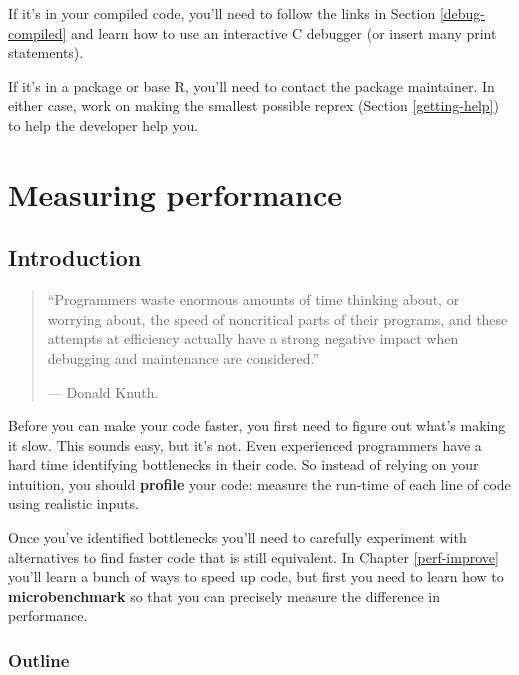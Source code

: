\documentclass[]{book}
\begin{document}
\begin{itemize}
  If it's in your compiled code, you'll need to follow the links in Section
  \ref{debug-compiled} and learn how to use an interactive C debugger
  (or insert many print statements).

  If it's in a package or base R, you'll need to contact the package
  maintainer. In either case, work on making the smallest possible
  reprex (Section \ref{getting-help}) to help the developer help you.
\end{itemize}

\hypertarget{perf-measure}{%
\chapter{Measuring performance}\label{perf-measure}}


\hypertarget{introduction-6}{%
\section{Introduction}\label{introduction-6}}

\begin{quote}
``Programmers waste enormous amounts of time thinking about, or worrying
about, the speed of noncritical parts of their programs, and these attempts
at efficiency actually have a strong negative impact when debugging and
maintenance are considered.''

\hspace*{\fill} --- Donald Knuth.
\end{quote}

Before you can make your code faster, you first need to figure out what's making it slow. This sounds easy, but it's not. Even experienced programmers have a hard time identifying bottlenecks in their code. So instead of relying on your intuition, you should \textbf{profile} your code: measure the run-time of each line of code using realistic inputs.

Once you've identified bottlenecks you'll need to carefully experiment with alternatives to find faster code that is still equivalent. In Chapter \ref{perf-improve} you'll learn a bunch of ways to speed up code, but first you need to learn how to \textbf{microbenchmark} so that you can precisely measure the difference in performance.

\hypertarget{outline-6}{%
\subsection*{Outline}\label{outline-6}}
\end{document}
